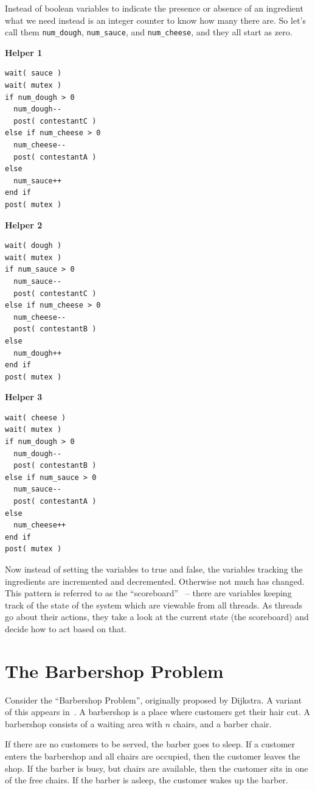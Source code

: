 \documentclass[a4paper]{report}
\begin{document}
Instead of boolean variables to indicate the presence or absence of an ingredient what we need instead is an integer counter to know how many there are. So let's call them \texttt{num\_dough}, \texttt{num\_sauce}, and \texttt{num\_cheese}, and they all start as zero.

\begin{multicols}{3}
	\textbf{Helper 1}
	\begin{lstlisting}
wait( sauce )
wait( mutex )
if num_dough > 0  
  num_dough--
  post( contestantC )
else if num_cheese > 0
  num_cheese--
  post( contestantA )
else
  num_sauce++
end if  
post( mutex )
\end{lstlisting}
	\columnbreak
	\textbf{Helper 2}
	\begin{lstlisting}
wait( dough )
wait( mutex )
if num_sauce > 0  
  num_sauce--
  post( contestantC )
else if num_cheese > 0
  num_cheese--
  post( contestantB )
else
  num_dough++
end if  
post( mutex )
\end{lstlisting}
	\columnbreak
	\textbf{Helper 3}
	\begin{lstlisting}
wait( cheese )
wait( mutex )
if num_dough > 0 
  num_dough--
  post( contestantB )
else if num_sauce > 0
  num_sauce--
  post( contestantA )
else
  num_cheese++
end if  
post( mutex )
\end{lstlisting}
\end{multicols}

Now instead of setting the variables to true and false, the variables tracking the ingredients are incremented and decremented. Otherwise not much has changed. This pattern is referred to as the ``scoreboard''~\cite{lbs} -- there are variables keeping track of the state of the system which are viewable from all threads. As threads go about their actions, they take a look at the current state (the scoreboard) and decide how to act based on that.

\section*{The Barbershop Problem}
Consider the ``Barbershop Problem'', originally proposed by Dijkstra. A variant of this appears in~\cite{osc}. A barbershop is a place where customers get their hair cut. A barbershop consists of a waiting area with $n$ chairs, and a barber chair.

If there are no customers to be served, the barber goes to sleep. If a customer enters the barbershop and all chairs are occupied, then the customer leaves the shop. If the barber is busy, but chairs are available, then the customer sits in one of the free chairs. If the barber is asleep, the customer wakes up the barber.
\end{document}
